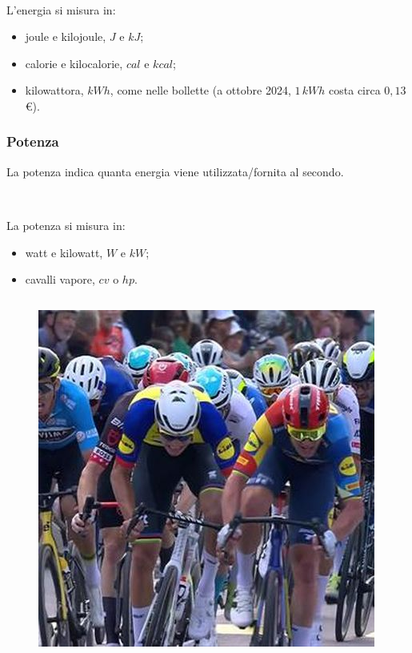\documentclass[handout]{beamer}
\theoremstyle{plain}
\begin{document}
\begin{frame}
\begin{columns}
\begin{column}{0.3\textwidth}
\begin{figure}
  \end{figure}    
  \end{column}
\end{columns}

~

L'energia si misura in:
\begin{itemize}
  \item joule e kilojoule, $ J $ e $ kJ $;
  \item calorie e kilocalorie, $ cal $ e $ kcal $;
  \item kilowattora, $ kWh $, come nelle bollette (a ottobre 2024, $ 1 \, kWh  $ costa circa $ 0,13 $ €).
\end{itemize}
\end{frame}


\begin{frame}
\frametitle{Potenza}
La potenza indica quanta energia viene utilizzata/fornita al secondo.

~

La potenza si misura in:
\begin{itemize}
  \item watt e kilowatt, $ W $ e $ kW $;
  \item cavalli vapore, $ cv $ o $ hp $.
\end{itemize}

\begin{columns}
  \begin{column}{0.25\textwidth}
  \begin{figure}
    \includegraphics[width=\columnwidth]{img/ciclisti.jpg}


\end{figure}
\end{column}
\end{columns}
\end{frame}
\end{document}

